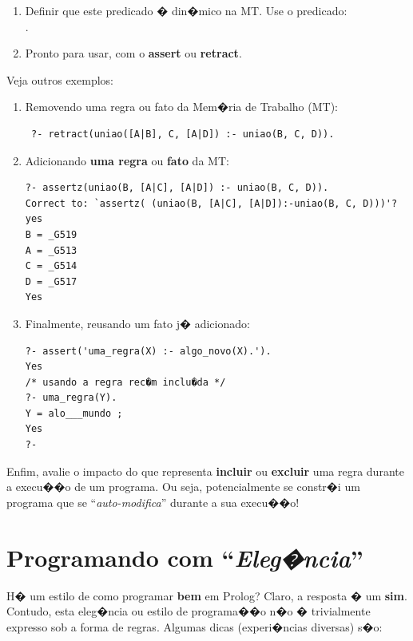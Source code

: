 \documentclass[final,a4paper]{article}
\begin{document}
\begin{enumerate}
    \item Definir que este predicado �
    din�mico na MT. Use o predicado: \\
     .
    \item Pronto para usar, com o \textbf{assert} ou
    \textbf{retract}.
\end{enumerate}

\newpage
Veja outros exemplos:
\begin{enumerate}
\item Removendo uma regra ou fato da Mem�ria de Trabalho (MT):
{\small
\begin{verbatim}
 ?- retract(uniao([A|B], C, [A|D]) :- uniao(B, C, D)).
\end{verbatim}
}

\item Adicionando {\bf uma regra} ou {\bf fato} da MT:
{\small
\begin{verbatim}
?- assertz(uniao(B, [A|C], [A|D]) :- uniao(B, C, D)).
Correct to: `assertz( (uniao(B, [A|C], [A|D]):-uniao(B, C, D)))'?
yes
B = _G519
A = _G513
C = _G514
D = _G517
Yes
\end{verbatim}
}

\item Finalmente, reusando um fato j�
adicionado:
{\small
\begin{verbatim}
?- assert('uma_regra(X) :- algo_novo(X).').
Yes
/* usando a regra rec�m inclu�da */
?- uma_regra(Y).
Y = alo___mundo ;
Yes
?-
\end{verbatim}
}
\end{enumerate}

 Enfim, avalie o impacto do que representa {\bf incluir} ou {\bf excluir} uma regra durante a execu��o de um programa. Ou seja, potencialmente se constr�i um programa
que se ``{\em auto-modifica}'' durante a sua execu��o!

\section{Programando com ``{\em Eleg�ncia}''}

H� um estilo de como programar {\bf bem}
em Prolog? Claro, a resposta � um
{\bf sim}. Contudo, esta eleg�ncia ou estilo de programa��o n�o
� trivialmente expresso sob a forma de
regras. Algumas dicas (experi�ncias
diversas) s�o:
\end{document}
